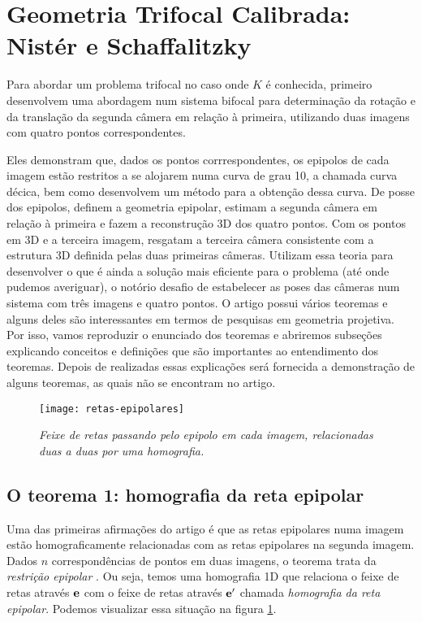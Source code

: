 \newpage
\section{Geometria Trifocal Calibrada: Nistér e Schaffalitzky}\label{sec.nister}

Para abordar um problema trifocal no caso onde $K$ é conhecida, primeiro \cite{2503343} desenvolvem uma abordagem num sistema bifocal para determinação da rotação e da translação da segunda câmera em relação à primeira, utilizando duas imagens com quatro pontos correspondentes. 

Eles demonstram que, dados os pontos corrrespondentes, os epipolos de cada imagem estão restritos a se alojarem numa curva de grau 10, a chamada curva décica, bem como desenvolvem um método para a obtenção dessa curva. De posse dos epipolos, definem a geometria epipolar, estimam a segunda câmera em relação à primeira e fazem a reconstrução 3D dos quatro pontos. Com os pontos em 3D e a terceira imagem, resgatam a terceira câmera consistente com a estrutura 3D definida pelas duas primeiras câmeras. Utilizam essa teoria para desenvolver o que é ainda a solução mais eficiente para o problema (até onde pudemos averiguar), o notório desafio de estabelecer as poses das câmeras num sistema com três imagens e quatro pontos. O artigo possui vários teoremas e alguns deles são interessantes em termos de pesquisas em geometria projetiva. Por isso, vamos reproduzir o enunciado dos teoremas e abriremos subseções explicando conceitos e definições que são importantes ao entendimento dos teoremas. Depois de realizadas essas explicações será fornecida a demonstração de alguns teoremas, as quais não se encontram no artigo.

\begin{figure}[!htb]
\centering
\texttt{[image: retas-epipolares]}
\caption{\textit{Feixe de retas passando pelo epipolo em cada imagem, relacionadas duas a duas por uma homografia.}}
\label{retas-epipolares}
\end{figure}

\subsection{O teorema 1: homografia da reta epipolar}\label{sec.homografia-reta-epipolar} 


Uma das primeiras afirmações do artigo é que as retas epipolares numa  imagem estão homograficamente relacionadas com as retas epipolares na segunda imagem. Dados $n$ correspondências de pontos em duas imagens, o teorema trata da \textit{restrição epipolar} \citep{faugeras93three}. Ou seja, temos uma homografia 1D que relaciona o feixe de retas através ${\bf e}$ com o feixe de retas através ${\bf e'}$ chamada \textit{homografia da reta epipolar}. Podemos visualizar essa situação na figura \ref{retas-epipolares}.

